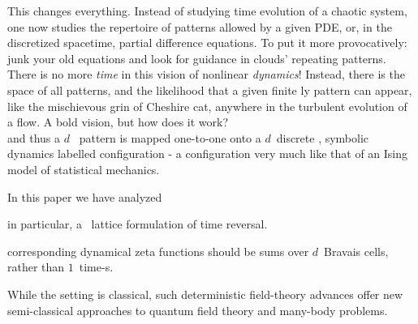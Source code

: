 This changes everything. Instead of studying time evolution of a chaotic
system, one now studies the repertoire of {\spt} patterns allowed by
a given PDE, or, in the discretized spacetime, partial difference equations.
To put it more provocatively: junk your old equations and look for guidance
in clouds' repeating patterns.
There is no more \emph{time} in this vision of nonlinear \emph{dynamics}!
Instead, there is the space of all {\spt} patterns, and the
likelihood that a given finite {\spt}ly pattern can appear, like the
mischievous grin of Cheshire cat, anywhere in the turbulent evolution of a flow.
A bold vision, but how does it work?
\\

and thus a $d$\dmn\ {\spt} pattern is
mapped one-to-one onto a $d$\dmn\ discrete {\lattstate}, symbolic
dynamics labelled configuration - a configuration very much like that of an
Ising model of statistical mechanics.

In this paper we have analyzed

in particular, a \spt\ lattice formulation of time
reversal.



corresponding dynamical zeta functions
should be sums over $d$\dmn\ Bravais cells, rather than $1$\dmn\ time-\po s.


While the setting is classical,
such deterministic field-theory advances offer new semi-classical
approaches to quantum field theory and many-body problems.
